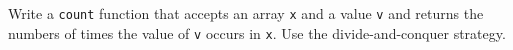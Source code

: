 Write a \verb!count! function that accepts an array \verb!x!
and a value \verb!v! and returns the numbers of times the value of
\verb!v! occurs in \verb!x!. 
Use the divide-and-conquer strategy.
